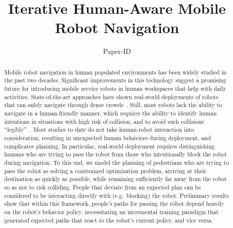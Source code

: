 \documentclass[conference]{IEEEtran}
\begin{document}
\title{Iterative Human-Aware Mobile Robot Navigation}

\author{Paper-ID}



\maketitle

\begin{abstract}
Mobile robot navigation in human populated environments has been
widely studied in the past two decades. Significant improvements in
this technology suggest a promising future for introducing mobile
service robots in human workspaces that help with daily
activities. State-of-the-art approaches have shown real-world
deployments of robots that can safely navigate through dense
crowds~\cite{trautman2015robot, pfeiffer2016predicting}. Still, most
robots lack the ability to navigate in a human-friendly manner, which
requires the ability to identify human intentions in situations with
high risk of collision, and to avoid such collisions
“legibly”~\cite{dragan2013legibility}. Most studies to date do not
take human-robot interaction into consideration, resulting in
unexpected human behaviors during deployment, and complicates
planning.  In particular, real-world deployment requires
distinguishing humans who are trying to pass the robot from those who
intentionally block the robot during navigation.  To this end, we
model the planning of pedestrians who are trying to pass the robot as
solving a constrained optimization problem, arriving at their
destination as quickly as possible, while remaining sufficiently far
away from the robot so as not to risk colliding.  People that deviate
from an expected plan can be considered to be interacting directly
with (e.g.\ blocking) the robot.  Preliminary results show that within
this framework, people's paths for passing the robot depend heavily on
the robot's behavior policy, necessitating an incremental training
paradigm that generated expected paths that react to the robot's
current policy, and vice versa.

\end{abstract}

\IEEEpeerreviewmaketitle
\end{document}
